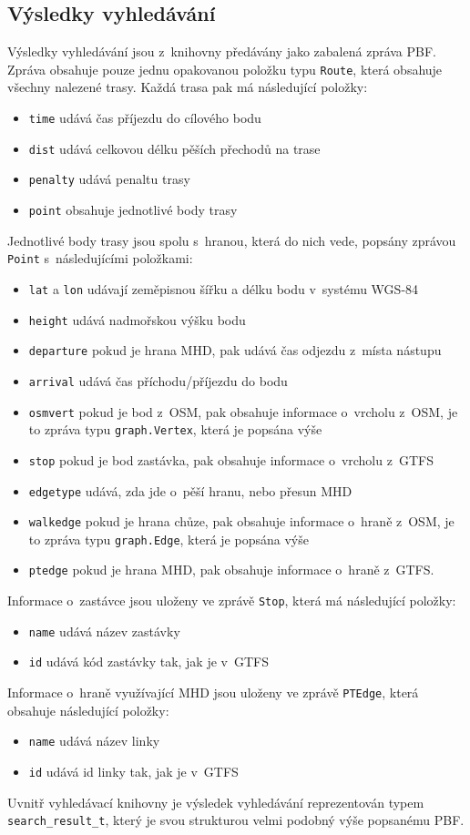 \subsection{Výsledky vyhledávání}
\label{ch:formaty-dat:vysledky}
Výsledky vyhledávání jsou z~knihovny předávány jako zabalená zpráva PBF. Zpráva
obsahuje pouze jednu opakovanou položku typu {\tt Route}, která obsahuje všechny
nalezené trasy. Každá trasa pak má následující položky: 
\begin{itemize}
	\item {\tt time} udává čas příjezdu do cílového bodu
	\item {\tt dist} udává celkovou délku pěších přechodů na trase
	\item {\tt penalty} udává penaltu trasy
	\item {\tt point} obsahuje jednotlivé body trasy
\end{itemize}
Jednotlivé body trasy jsou spolu s~hranou, která do nich vede, popsány zprávou
{\tt Point} s~následujícími položkami: 
\begin{itemize}
	\item {\tt lat} a {\tt lon} udávají zeměpisnou šířku a délku bodu
v~systému WGS-84
	\item {\tt height} udává nadmořskou výšku bodu
	\item {\tt departure} pokud je hrana MHD, pak udává čas odjezdu z~místa
	nástupu
	\item {\tt arrival} udává čas příchodu/příjezdu do bodu 
	\item {\tt osmvert} pokud je bod z~OSM, pak obsahuje informace o~vrcholu
	z~OSM, je to zpráva typu {\tt graph.Vertex}, která je popsána výše
	\item {\tt stop} pokud je bod zastávka, pak obsahuje informace o~vrcholu z~GTFS
	\item {\tt edgetype} udává, zda jde o~pěší hranu, nebo přesun MHD
	\item {\tt walkedge} pokud je hrana chůze, pak obsahuje informace
o~hraně z~OSM, je to zpráva typu {\tt graph.Edge}, která je popsána výše
	\item {\tt ptedge} pokud je hrana MHD, pak obsahuje informace o~hraně
z~GTFS.
\end{itemize}
Informace o~zastávce jsou uloženy ve zprávě {\tt Stop}, která má následující
položky:
\begin{itemize}
	\item {\tt name} udává název zastávky
	\item {\tt id} udává kód zastávky tak, jak je v~GTFS
\end{itemize}
Informace o~hraně využívající MHD jsou uloženy ve zprávě {\tt PTEdge}, která
obsahuje následující položky:
\begin{itemize}
	\item {\tt name} udává název linky
	\item {\tt id} udává id linky tak, jak je v~GTFS
\end{itemize}
Uvnitř vyhledávací knihovny je výsledek vyhledávání reprezentován typem {\tt
search\_result\_t}, který je svou strukturou velmi podobný výše popsanému PBF.

